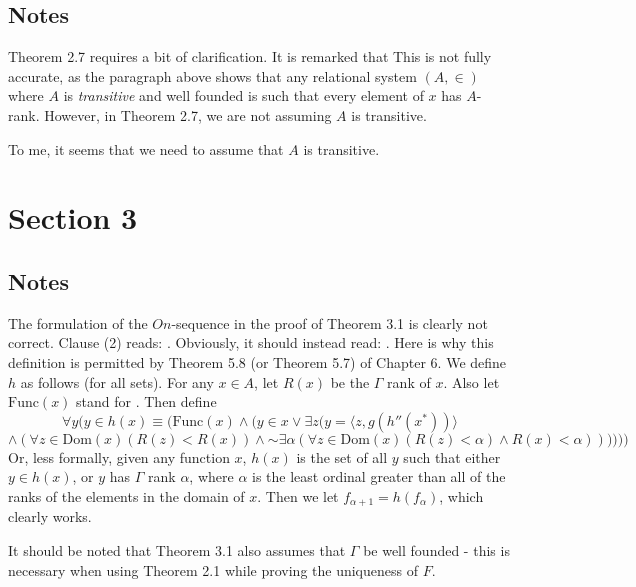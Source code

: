 \documentclass{article}
\newcommand*{\oldneg}{\mathord{\sim}}
\theoremstyle{definition}
\begin{document}
\subsection*{Notes}
Theorem 2.7 requires a bit of clarification. It is remarked that  This is not fully accurate, as the paragraph above shows that 
any relational system $(A,\in)$ where $A$ is \textit{transitive} and well founded is such that 
every element of $x$ has $A$-rank. However, in Theorem 2.7, we are not assuming $A$ is transitive.

To me, it seems that we need to assume that $A$ is transitive.

\section*{Section 3}

\subsection*{Notes}
The formulation of the $On$-sequence in the proof of Theorem 3.1 is clearly not correct. Clause (2) reads: 
. Obviously, it should instead read: . Here is why this definition is permitted by Theorem 5.8 (or Theorem 5.7) of 
Chapter 6. We define $h$ as follows (for all sets). For any $x\in A$, let $R(x)$ be the $\Gamma$ rank of $x$. Also let 
$\textrm{Func}(x)$ stand for . Then define 
\[ \forall y(y\in h(x)\equiv (\textrm{Func}(x)\wedge (y\in x\vee \exists z(y=\langle z,g(h''(x^*))\rangle \]
\[ \wedge(\forall z\in\textrm{Dom}(x) (R(z)<R(x))\wedge\oldneg \exists \alpha(\forall z\in\textrm{Dom}(x)(R(z)<\alpha)\wedge R(x)<\alpha)))))) \]
Or, less formally, given any function $x$, $h(x)$ is the set of all $y$ such that either 
$y\in h(x)$, or $y$ has $\Gamma$ rank $\alpha$, where $\alpha$ is the least ordinal greater than all of the ranks of the 
elements in the domain of $x$. Then we let $f_{\alpha+1}=h(f_\alpha)$, which clearly works.

It should be noted that Theorem 3.1 also assumes that $\Gamma$ be well founded - this is necessary when using Theorem 2.1 while 
proving the uniqueness of $F$.
\end{document}

